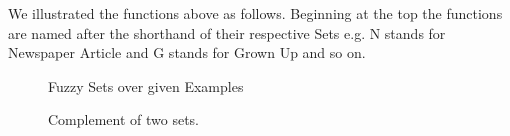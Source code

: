 \documentclass[a4paper]{scrartcl}
\begin{document}
We illustrated the functions above as follows. Beginning at the top the functions are named after the shorthand of their respective Sets e.g. N stands for Newspaper Article and G stands for Grown Up and so on.

\begin{figure}[H]
    \centering
    \quad
    \quad

\caption{Fuzzy Sets over given Examples}
\end{figure}	

\begin{figure}[H]
    \centering
    \quad
\caption{Complement of two sets.}
\end{figure}	
\end{document}
